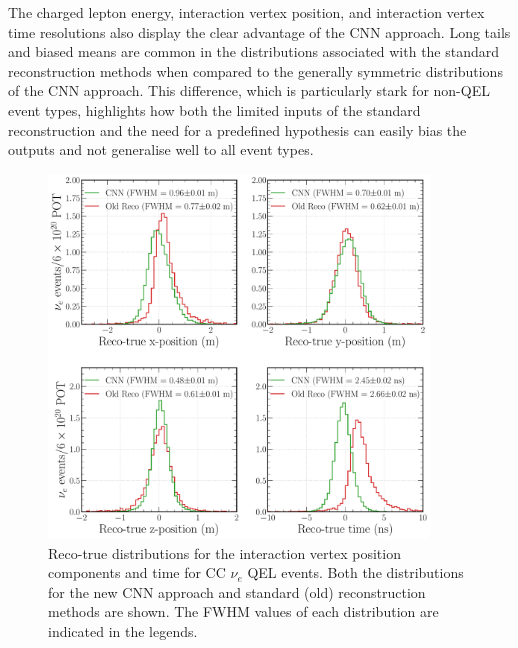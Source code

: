 The charged lepton energy, interaction vertex position, and interaction vertex time resolutions
also display the clear advantage of the CNN approach. Long tails and biased means are common in
the distributions associated with the standard reconstruction methods when compared to the
generally symmetric distributions of the CNN approach. This difference, which is particularly
stark for non-QEL event types, highlights how both the limited inputs of the standard
reconstruction and the need for a predefined hypothesis can easily bias the outputs and not
generalise well to all event types.

\begin{figure} %
    \includegraphics[width=0.9\textwidth]{diagrams/7-results/final_vertex_nuel_res_comparison.pdf}
    \caption[Reco-true distributions for the interaction vertex parameters for CC $\nu_{e}$ QEL
        events] {Reco-true distributions for the interaction vertex position components and time
        for CC $\nu_{e}$ QEL events. Both the distributions for the new CNN approach and standard
        (old) reconstruction methods are shown. The FWHM values of each distribution are indicated
        in the legends.}
    \label{fig:final_vertex_nuel_res_comparison}
\end{figure}

